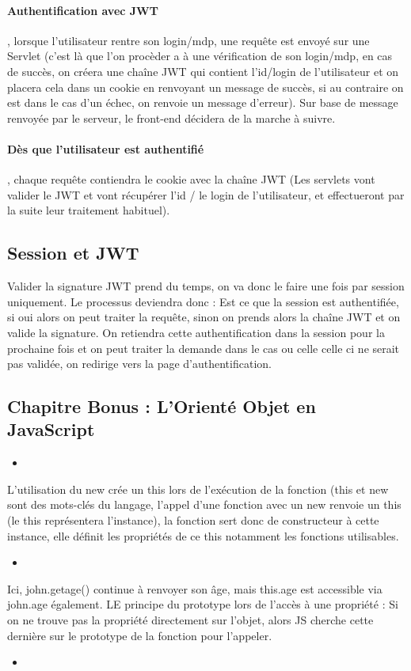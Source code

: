 \documentclass{article}[12pt]
\newcommand{\JavaScript}[2]{
	\begin{itemize}
		\item[]
	\end{itemize}
}
\begin{document}
\paragraph{Authentification avec JWT}, lorsque l'utilisateur rentre son login/mdp, une requête est envoyé sur une Servlet (c'est là que l'on procèder a à une vérification de son login/mdp, en cas de succès, on créera une chaîne JWT qui contient l'id/login de l'utilisateur et on placera cela dans un cookie en renvoyant un message de succès, si au contraire on est dans le cas d'un échec, on renvoie un message d'erreur). Sur base de message renvoyée par le serveur, le front-end décidera de la marche à suivre.
\newline
\newline
\paragraph{Dès que l'utilisateur est authentifié}, chaque requête contiendra le cookie avec la chaîne JWT (Les servlets vont valider le JWT et vont récupérer l'id / le login de l'utilisateur, et effectueront par la suite leur traitement habituel).
\subsection{Session et JWT}
Valider la signature JWT prend du temps, on va donc le faire une fois par session uniquement. Le processus deviendra donc : Est ce que la session est authentifiée, si oui alors on peut traiter la requête, sinon on prends alors la chaîne JWT et on valide la signature. On retiendra cette authentification dans la session pour la prochaine fois et on peut traiter la demande dans le cas ou celle celle ci ne serait pas validée, on redirige vers la page d'authentification.
\subsection{Chapitre Bonus : L'Orienté Objet en JavaScript}
\JavaScript{oo_js}{Exemple d'orienté objet en JavaScript}
L'utilisation du new crée un this lors de l'exécution de la fonction (this et new sont des mots-clés du langage, l'appel d'une fonction avec un new renvoie un this (le this représentera l'instance), la fonction sert donc de constructeur à cette instance, elle définit les propriétés de ce this notamment les fonctions utilisables.
\JavaScript{prototype}{Exemple de prototype JavaScript}
Ici, john.getage() continue à renvoyer son âge, mais this.age est accessible via john.age également. LE principe du prototype lors de l'accès à une propriété : Si on ne trouve pas la propriété directement sur l'objet, alors JS cherche cette dernière sur le prototype de la fonction pour l'appeler.
\JavaScript{heritage_prototype}{Exemple d'Héritage par prototype}
\end{document}
